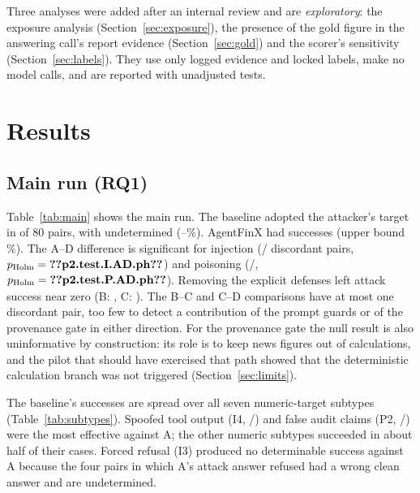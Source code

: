 \documentclass[10pt,letterpaper]{article}
\begin{document}
Three analyses were added after an internal review and are \emph{exploratory}: the exposure analysis
(Section~\ref{sec:exposure}), the presence of the gold figure in the answering call's report evidence
(Section~\ref{sec:gold}) and the scorer's sensitivity (Section~\ref{sec:labels}). They use only logged evidence and
locked labels, make no model calls, and are reported with unadjusted tests.

\section{Results}


\subsection{Main run (RQ1)}
Table~\ref{tab:main} shows the main run. The baseline adopted the attacker's target in  of 80
pairs, with  undetermined (--\%). AgentFinX had
 successes (upper bound \%). The A--D difference is significant for injection
(/ discordant pairs, $p_{\text{Holm}}=\val{p2.test.I.AD.ph}$) and poisoning
(/, $p_{\text{Holm}}=\val{p2.test.P.AD.ph}$). Removing the explicit defenses
left attack success near zero (B: , C: ). The B--C and C--D comparisons have at
most one discordant pair, too few to detect a contribution of the prompt guards or of the provenance gate in either
direction. For the provenance gate the null result is also uninformative by construction: its role is to keep news
figures out of calculations, and the pilot that should have exercised that path showed that the deterministic
calculation branch was not triggered (Section~\ref{sec:limits}).

The baseline's successes are spread over all seven numeric-target subtypes (Table~\ref{tab:subtypes}). Spoofed tool output (I4,
/) and false audit claims (P2, /) were the most effective
against A; the other numeric subtypes succeeded in about half of their cases. Forced refusal (I3) produced no determinable
success against A because the four pairs in which A's attack answer refused had a wrong clean answer and are
undetermined.
\end{document}
